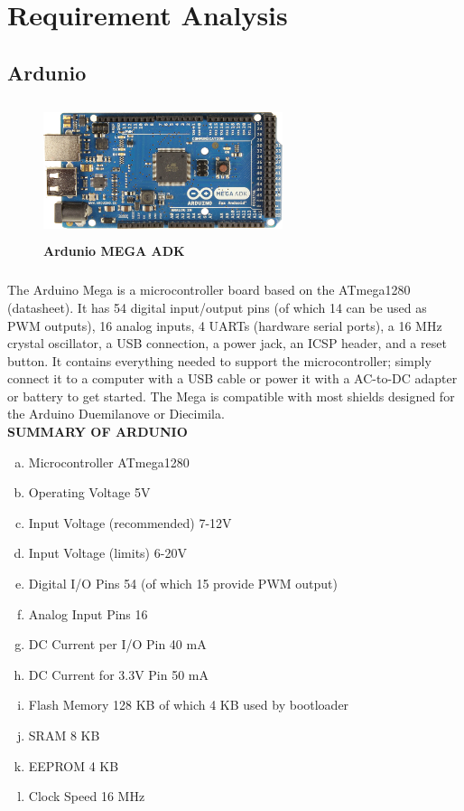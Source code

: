 \chapter{Requirement Analysis}
\section{Ardunio}
\begin{figure}[H]
 \centering
    \includegraphics[height= 4cm, width=7cm]{project/images/ardunio}
  \caption{\textbf{Ardunio MEGA ADK}}
\end{figure}
\paragraph{}The Arduino Mega is a microcontroller board based on the ATmega1280 (datasheet). It has 54 digital input/output pins (of which 14 can be used as PWM outputs), 16 analog inputs, 4       UARTs (hardware serial ports), a 16 MHz crystal oscillator, a USB connection, a power jack, an ICSP header, and a reset button. It contains everything needed to support the microcontroller; simply connect it to a computer with a USB cable or power it with a AC-to-DC adapter or battery to get started. The Mega is compatible with most shields designed for the Arduino Duemilanove or Diecimila.
\large{\textbf{\\SUMMARY OF ARDUNIO}} 
\begin{enumerate}[a. ]
 \item Microcontroller ATmega1280
 \item Operating Voltage	5V
\item Input Voltage (recommended)	7-12V
\item Input Voltage (limits)	6-20V
\item Digital I/O Pins	54 (of which 15 provide PWM output)
\item Analog Input Pins	16
\item DC Current per I/O Pin	40 mA
\item DC Current for 3.3V Pin	50 mA
\item Flash Memory	128 KB of which 4 KB used by bootloader
\item SRAM	8 KB
\item EEPROM	4 KB
\item Clock Speed	16 MHz

\end{enumerate}

